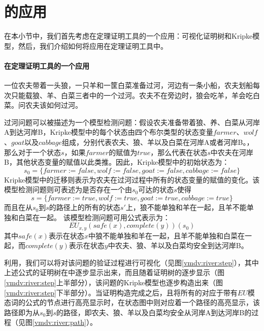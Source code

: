\section{的应用}
在本小节中，我们首先考虑在定理证明工具\sctlprov{}的一个应用：可视化证明树和Kripke模型，然后，我们介绍如何将应用在定理证明工具中。
\paragraph{在定理证明工具\sctlprov{}的一个应用}
\begin{example} [过河问题]
	一位农夫带着一头狼，一只羊和一筐白菜准备过河，河边有一条小船，农夫划船每次只能载狼、羊、白菜三者中的一个过河。农夫不在旁边时，狼会吃羊，羊会吃白菜。问农夫该如何过河。
\end{example}	
	过河问题可以被描述为一个模型检测问题：假设农夫准备带着狼、养、白菜从河岸A到达河岸B，Kripke模型中的每个状态由四个布尔类型的状态变量{$farmer$}、$wolf$、$goat$以及$cabbage$组成，分别代表农夫、狼、羊以及白菜在河岸A或者河岸B。，那么对于一个状态$s$，如果$farmer$的赋值为$true$，那么代表在状态$s$中农夫在河岸B，其他状态变量的赋值以此类推。因此，Kripke模型中的初始状态为：$$s_0=\{farmer := false, wolf := false, goat := false, cabbage := false\}$$
	Kripke模型中的迁移则表示为农夫在过河过程中所有的状态变量的赋值的变化。该模型检测问题则可表述为是否存在一个由$s_0$可达的状态$s$使得
	$$s=\{farmer := true, wolf := true, goat := true, cabbage := true\}$$
	而且在从$s_0$到$s$的路径上的所有的状态$s'$上，狼不能单独和羊在一起，且羊不能单独和白菜在一起。
	该模型检测问题可用\CTLP{}公式表示为：$$EU_{x,y}(safe(x), complete(y))(s_0)$$
	其中$safe(x)$表示在状态$x$中狼不能单独和羊在一起，且羊不能单独和白菜在一起，而$complete(y)$表示在状态$y$中农夫、狼、羊以及白菜均安全到达河岸B。
	
	利用，我们可以将\sctlprov{}对该问题的验证过程进行可视化（见图\ref{vmdv:river:step}），其中上述\CTLP{}公式的证明树在中逐步显示出来，而且随着证明树的逐步显示（图\ref{vmdv:river:step}上半部分），该问题的Kripke模型也逐步构造出来（图\ref{vmdv:river:step}下半部分）。当证明构造完成之后，且将所有的对应于带有$EU$模态词的公式的节点进行高亮显示时，在状态图中则对应着一个路径的高亮显示，该路径即为从$s_0$到$s$的路径，即农夫、狼、羊以及白菜均安全从河岸A到达河岸B的过程（见图\ref{vmdv:river:path}）。
	
